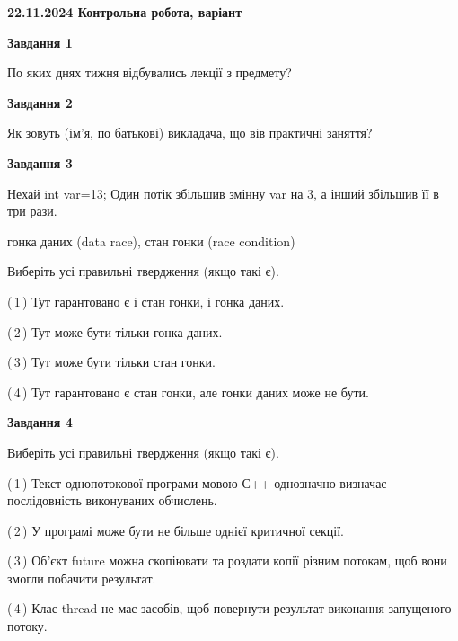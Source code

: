 \documentclass[12pt, ukrainian]{article}
\begin{document}
\begin {large}

\textbf{22.11.2024 Контрольна робота, варіант  }\par


{

\begin{center}
\textbf{Завдання 1}
\end{center}

По яких днях тижня відбувались лекції з предмету?


\begin{center}
\textbf{Завдання 2}
\end{center}

Як зовуть (ім'я, по батькові) викладача, що вів практичні заняття?


\begin{center}
\textbf{Завдання 3}
\end{center}

Нехай int var=13; Один потік збільшив змінну var на 3, а інший збільшив її в три рази.

гонка даних (data race), стан гонки (race condition)

Виберіть усі правильні твердження (якщо такі є).\par
\vspace{2mm}
(\,1\,) Тут гарантовано є і стан гонки, і гонка даних.%

(\,2\,) Тут може бути тільки гонка даних.%

(\,3\,) Тут може бути тільки стан гонки.%

(\,4\,) Тут гарантовано є стан гонки, але гонки даних може не бути.%


\begin{center}
\textbf{Завдання 4}
\end{center}

Виберіть усі правильні твердження (якщо такі є).\par
\vspace{2mm}

(\,1\,) Текст однопотокової програми мовою С++ однозначно визначає послідовність виконуваних обчислень.%

(\,2\,) У програмі може бути не більше однієї критичної секції.%

(\,3\,) Об’єкт future можна скопіювати та роздати копії різним потокам, щоб вони змогли побачити результат.%

(\,4\,) Клас thread не має засобів, щоб повернути результат виконання запущеного потоку.%


}
\end{large}
\end{document}
